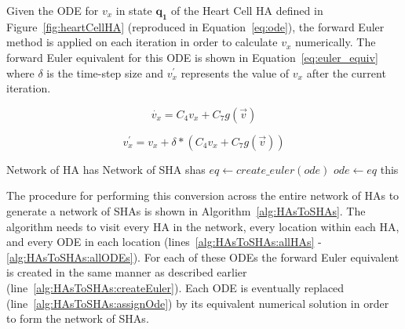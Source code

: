 Given the \ac{ODE} for $v_x$ in state $\mathbf{q_1}$ of the Heart Cell \ac{HA} defined in Figure~\ref{fig:heartCellHA} (reproduced in Equation~\ref{eq:ode}), the forward Euler method is applied on each iteration in order to calculate $v_x$ numerically.
The forward Euler equivalent for this ODE is shown in Equation~\ref{eq:euler_equiv} where $\delta$ is the time-step size and $v^\prime_x$ represents the value of $v_x$ after the current iteration.

\begin{equation}
\dot{v_x} = C_{4} v_x + C_{7} g(\vec{v})
\label{eq:ode}
\end{equation}

\begin{equation}
v^\prime_x = v_x + \delta * (C_{4} v_x + C_{7} g(\vec{v}))
\label{eq:euler_equiv}
\end{equation}

\renewcommand{\algorithmiccomment}[1]{// #1}
\renewcommand{\algorithmicrequire}{\textbf{Input:}}
\renewcommand{\algorithmicensure}{\textbf{Output:}}
\begin{algorithm}[t!]
	\begin{algorithmic}[1]
		\REQUIRE Network of HA has 
		\ENSURE Network of SHA shas
		 \label{alg:HAsToSHAs:allHAs}
		  \label{alg:HAsToSHAs:allLocs}
		 \label{alg:HAsToSHAs:allODEs}
		\STATE $eq \leftarrow create\_euler(ode)$ \label{alg:HAsToSHAs:createEuler}
		\STATE $ode \leftarrow eq$ \label{alg:HAsToSHAs:assignOde}
		\ENDFOR
		\ENDFOR
		\ENDFOR
		\RETURN this
	\end{algorithmic}
	\caption{The algorithm to generate a Network of \acp{SHA} from a Network of \acp{HA}}
	\label{alg:HAsToSHAs}
\end{algorithm}

The procedure for performing this conversion across the entire network of \acp{HA} to generate a network of \acp{SHA} is shown in Algorithm~\ref{alg:HAsToSHAs}.
The algorithm needs to visit every \ac{HA} in the network, every location within each \ac{HA}, and every \ac{ODE} in each location (lines~\ref{alg:HAsToSHAs:allHAs} - \ref{alg:HAsToSHAs:allODEs}).
For each of these \acp{ODE} the forward Euler equivalent is created in the same manner as described earlier (line~\ref{alg:HAsToSHAs:createEuler}).
Each \ac{ODE} is eventually replaced (line~\ref{alg:HAsToSHAs:assignOde}) by its equivalent numerical solution in order to form the network of \acp{SHA}.
